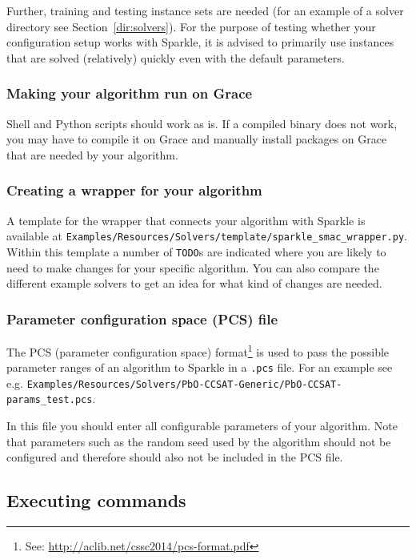 \documentclass{article}
\begin{document}
Further, training and testing instance sets are needed (for an example of a solver directory see Section~\ref{dir:solvers}). For the purpose of testing whether your configuration setup works with Sparkle, it is advised to primarily use instances that are solved (relatively) quickly even with the default parameters.

\subsubsection{Making your algorithm run on Grace}
\label{quick:solver_grace}

Shell and Python scripts should work as is. If a compiled binary does not work, you may have to compile it on Grace and manually install packages on Grace that are needed by your algorithm.

\subsubsection{Creating a wrapper for your algorithm}
\label{quick:config_wrapper}

A template for the wrapper that connects your algorithm with Sparkle is available at \texttt{Examples/Resources/Solvers/template/sparkle\_smac\_wrapper.py}. Within this template a number of \texttt{TODO}s are indicated where you are likely to need to make changes for your specific algorithm. You can also compare the different example solvers to get an idea for what kind of changes are needed.

\subsubsection{Parameter configuration space (PCS) file}
\label{quick:pcs_file}

The PCS (parameter configuration space) format\footnote{See: \url{http://aclib.net/cssc2014/pcs-format.pdf}} is used to pass the possible parameter ranges of an algorithm to Sparkle in a \texttt{.pcs} file. For an example see e.g. \texttt{Examples/Resources/Solvers/PbO-CCSAT-Generic/PbO-CCSAT-params\_test.pcs}.

In this file you should enter all configurable parameters of your algorithm. Note that parameters such as the random seed used by the algorithm should not be configured and therefore should also not be included in the PCS file.

\subsection{Executing commands}
\label{quick:execute_commands}
\end{document}
